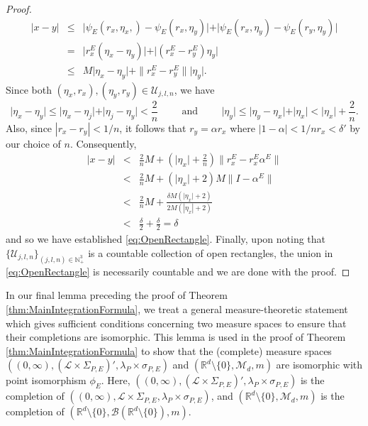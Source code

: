 \documentclass[11pt, letter]{book}
\begin{document}
\begin{proof}
\begin{eqnarray*}
| x - y | &\leq& \vert \psi_E(r_x,\eta_x,) - \psi_E(r_x,\eta_y) \vert 
    + \vert \psi_E(r_x,\eta_y) - \psi_E(r_y,\eta_y) \vert\\
    &=&  \vert r_x^E (\eta_x - \eta_y) \vert + \vert (r_x^E - r_y^E) \eta_y \vert\\
    &\leq& M\vert \eta_x - \eta_y \vert + \|{r_x^E - r_y^E}\|  \vert \eta_y \vert.
\end{eqnarray*}
Since both $(\eta_x,r_x),(\eta_y,r_y) \in \mathcal{U}_{j,l,n}$, we have
\begin{equation*}
    \vert \eta_x - \eta_y \vert \leq \vert \eta_x - \eta_j \vert + \vert \eta_j - \eta_y \vert < \frac{2}{n}
\hspace{1cm}\mbox{and}\hspace{1cm}
    \vert \eta_y \vert \leq \vert \eta_y - \eta_x \vert + \vert \eta_x \vert < \vert \eta_x \vert + \frac{2}{n}.
\end{equation*}
Also, since $|r_x-r_y|<1/n$, it follows that $r_y=\alpha r_x$ where $|1-\alpha|<1/nr_x < \delta'$ by our choice of $n$. Consequently,
\begin{eqnarray*}
    \vert x - y \vert 
    &< & \frac{2}{n} M+ \left( \vert \eta_x \vert + \frac{2}{n} \right) \|{r_x^E -  r_x^E \alpha^E}\|   \\ 
    &<& \frac{2}{n}M + \left( \vert \eta_x \vert + 2 \right)M\| I - \alpha^E\| \\
    &<&  \frac{2}{n}M +  \frac{\delta M \left( \vert \eta_x \vert + 2\right) }{2M (| \eta_x | + 2)}  \\
    &<& \frac{\delta}{2} + \frac{\delta}{2}=\delta 
\end{eqnarray*}
and so we have established \eqref{eq:OpenRectangle}. Finally, upon noting that $\{\mathcal{U}_{j,l,n}\}_{(j,l,n)\in\mathbb{N}_+^3}$ is a countable collection of open rectangles, the union in \eqref{eq:OpenRectangle} is necessarily countable and we are done with the proof.
\end{proof}

\noindent In our final lemma preceding the proof of Theorem \ref{thm:MainIntegrationFormula}, we treat a general measure-theoretic statement which gives sufficient conditions concerning two measure spaces to ensure that their completions are isomorphic. This lemma is used in the proof of Theorem \ref{thm:MainIntegrationFormula} to show that the (complete) measure spaces $((0,\infty),(\mathcal{L}\times \Sigma_{P,E})',\lambda_P\times \sigma_{P,E})$ and $(\mathbb{R}^d\setminus \{ 0\},\mathcal{M}_d,m)$ are isomorphic with point isomorphism $\phi_E$. Here, $((0,\infty),(\mathcal{L}\times \Sigma_{P,E})',\lambda_P\times \sigma_{P,E})$ is the completion of $((0,\infty),\mathcal{L}\times \Sigma_{P,E},\lambda_P\times \sigma_{P,E})$, and $(\mathbb{R}^d\setminus \{ 0\},\mathcal{M}_d,m)$ is the completion of $(\mathbb{R}^d\setminus \{ 0\},\mathcal{B}(\mathbb{R}^d\setminus\{ 0 \}),m)$. 
\end{document}
